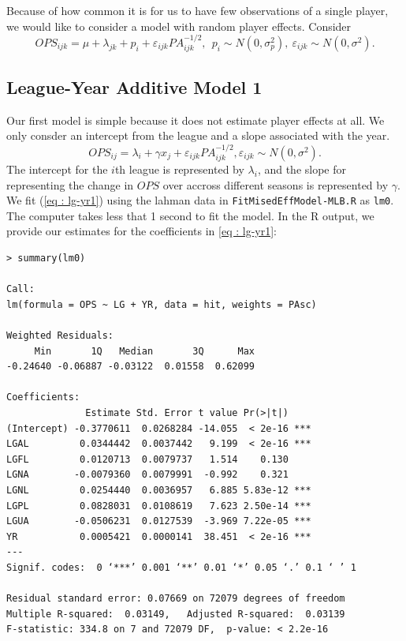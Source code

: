\documentclass [52pt] {article}
\begin{document}
Because of how common it is for us to have few observations of a single player, we would like to consider a model with random player effects.  Consider
\begin{equation}\label{eq : rand_player_model}
OPS_{ijk} = \mu+\lambda_{jk} + p_i+\varepsilon_{ijk}PA_{ijk}^{-1/2}, \:\:p_i\sim N(0,\sigma^2_p),\:\varepsilon_{ijk}\sim N(0, \sigma^2).
\end{equation}

\subsection{League-Year Additive Model 1}
Our first model is simple because it does not estimate player effects at all.  We only consder an intercept from the league and a slope associated with the year.
\begin{equation}\label{eq : lg-yr1}
OPS_{ij} = \lambda_i + \gamma x_j + \varepsilon_{ijk} PA_{ijk}^{-1/2}, \varepsilon_{ijk}\sim N(0,\sigma^2).
\end{equation}
The intercept for the $i$th league is represented by $\lambda_i$, and the slope for representing the change in $OPS$ over accross different seasons is represented by $\gamma$.  We fit (\ref{eq : lg-yr1}) using the lahman data in \verb|FitMisedEffModel-MLB.R| as \verb|lm0|.  The computer takes less that 1 second to fit the model.  In the R output, we provide our estimates for the coefficients in \ref{eq : lg-yr1}:
\begin{verbatim}
> summary(lm0)

Call:
lm(formula = OPS ~ LG + YR, data = hit, weights = PAsc)

Weighted Residuals:
     Min       1Q   Median       3Q      Max 
-0.24640 -0.06887 -0.03122  0.01558  0.62099 

Coefficients:
              Estimate Std. Error t value Pr(>|t|)    
(Intercept) -0.3770611  0.0268284 -14.055  < 2e-16 ***
LGAL         0.0344442  0.0037442   9.199  < 2e-16 ***
LGFL         0.0120713  0.0079737   1.514    0.130    
LGNA        -0.0079360  0.0079991  -0.992    0.321    
LGNL         0.0254440  0.0036957   6.885 5.83e-12 ***
LGPL         0.0828031  0.0108619   7.623 2.50e-14 ***
LGUA        -0.0506231  0.0127539  -3.969 7.22e-05 ***
YR           0.0005421  0.0000141  38.451  < 2e-16 ***
---
Signif. codes:  0 ‘***’ 0.001 ‘**’ 0.01 ‘*’ 0.05 ‘.’ 0.1 ‘ ’ 1

Residual standard error: 0.07669 on 72079 degrees of freedom
Multiple R-squared:  0.03149,	Adjusted R-squared:  0.03139 
F-statistic: 334.8 on 7 and 72079 DF,  p-value: < 2.2e-16
\end{verbatim}
\end{document}
